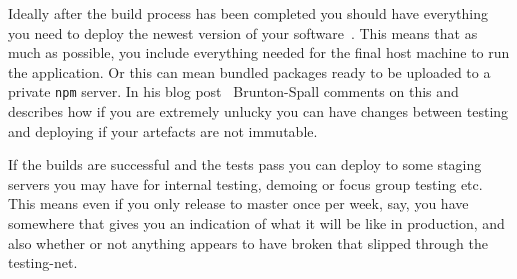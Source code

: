\par
Ideally after the build process has been completed you should have everything you need to deploy the newest version of your software~\cite{BruntonBuild}.
This means that as much as possible, you include everything needed for the final host machine to run the application.
Or this can mean bundled packages ready to be uploaded to a private \texttt{npm} server.
In his blog post~\cite{BruntonBuild} Brunton-Spall comments on this and describes
how if you are extremely unlucky you can have changes between testing and deploying if your artefacts are not immutable.
\par
If the builds are successful and the tests pass you can deploy to some staging servers you may have for internal testing, demoing or focus group testing etc.
This means even if you only release to master once per week, say,
you have somewhere that gives you an indication of what it will be like in production,
and also whether or not anything appears to have broken that slipped through the testing-net.
\par
